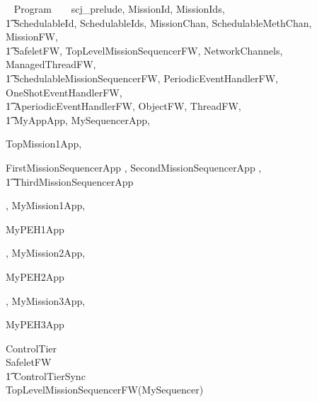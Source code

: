 
%
\begin{zsection}
  \SECTION ~ Program ~ \parents ~ scj\_prelude, MissionId, MissionIds, \\
  \t1 SchedulableId, SchedulableIds, MissionChan, SchedulableMethChan, MissionFW,\\
  \t1 SafeletFW, TopLevelMissionSequencerFW, NetworkChannels, ManagedThreadFW, \\
  \t1 SchedulableMissionSequencerFW, PeriodicEventHandlerFW, OneShotEventHandlerFW,\\
  \t1 AperiodicEventHandlerFW, ObjectFW, ThreadFW, \\
  \t1 MyAppApp, MySequencerApp,

TopMission1App,

FirstMissionSequencerApp
	,
SecondMissionSequencerApp
	,
\\ \t1
ThirdMissionSequencerApp
	
	
	,
MyMission1App,

MyPEH1App
	
	
	,
MyMission2App,

MyPEH2App
	
	
	,
MyMission3App,

MyPEH3App
	
	
	
\end{zsection}
%
\begin{circus}
\circprocess ControlTier \circdef \\
\circblockopen
SafeletFW \\
\t1 \lpar ControlTierSync \rpar \\
TopLevelMissionSequencerFW(MySequencer)
\circblockclose
\end{circus}
%


